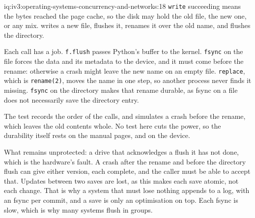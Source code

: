 \begin{solution}{iq:iv3:operating-systems-concurrency-and-networks:18}
\texttt{write} succeeding means the bytes reached the page cache, so the disk may hold the old file, the new one, or any mix.  writes a new file, flushes it, renames it over the old name, and flushes the directory.
\label{lst:iv3:os:atomicsave}

Each call has a job. \texttt{f.flush} passes Python's buffer to the kernel. \texttt{fsync} on the file forces the data and its metadata to the device, and it must come before the rename: otherwise a crash might leave the new name on an empty file. \texttt{replace}, which is \texttt{rename(2)}, moves the name in one step, so another process never finds it missing. \texttt{fsync} on the directory makes that rename durable, as fsync on a file does not necessarily save the directory entry.

The test records the order of the calls, and simulates a crash before the rename, which leaves the old contents whole. No test here cuts the power, so the durability itself rests on the manual pages, and on the device.

What remains unprotected: a drive that acknowledges a flush it has not done, which is the hardware's fault. A crash after the rename and before the directory flush can give either version, each complete, and the caller must be able to accept that. Updates between two saves are lost, as this makes each save atomic, not each change. That is why a system that must lose nothing appends to a log, with an fsync per commit, and a save is only an optimisation on top. Each fsync is slow, which is why many systems flush in groups.

\end{solution}

